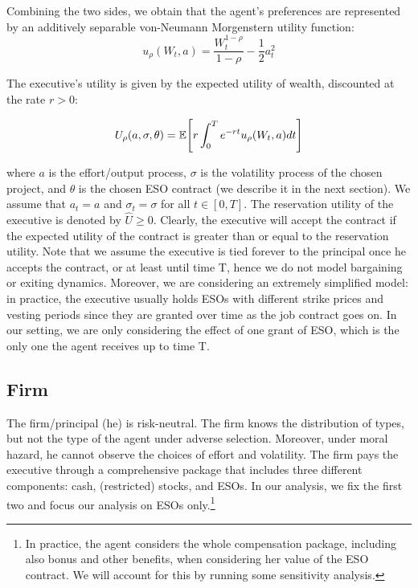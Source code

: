 Combining the two sides, we obtain that the agent's preferences are represented by an additively separable von-Neumann Morgenstern utility function:
$$ u_\rho (W_t, a) = \frac{W_t^{1-\rho}}{1-\rho} - \frac{1}{2}a_t^2 $$

The executive's utility is given by the expected utility of wealth, discounted at the rate $r>0$:

$$ U_\rho (a, \sigma, \theta) = \operatorname{\mathbb{E}} \Biggl[r \int_{0}^{T} e^{-rt} u_\rho (W_t, a) dt \Biggr]$$

where $a$ is the effort/output process, $\sigma$ is the volatility process of the chosen project, and $\theta$ is the chosen ESO contract (we describe it in the next section). We assume that $a_t=a$ and $\sigma_t=\sigma$ for all $t \in [0, T]$. The reservation utility of the executive is denoted by $\hat{U} \ge 0$. Clearly, the executive will accept the contract if the expected utility of the contract is greater than or equal to the reservation utility.
Note that we assume the executive is tied forever to the principal once he accepts the contract, or at least until time T, hence we do not model bargaining or exiting dynamics. Moreover, we are considering an extremely simplified model: in practice, the executive usually holds ESOs with different strike prices and vesting periods since they are granted over time as the job contract goes on. In our setting, we are only considering the effect of one grant of ESO, which is the only one the agent receives up to time T. 

\subsection{Firm}
The firm/principal (he) is risk-neutral. The firm knows the distribution of types, but not the type of the agent under adverse selection. Moreover, under moral hazard, he cannot observe the choices of effort and volatility. 
The firm pays the executive through a comprehensive package that includes three different components: cash, (restricted) stocks, and ESOs. In our analysis, we fix the first two and focus our analysis on ESOs only.\footnote{In practice, the agent considers the whole compensation package, including also bonus and other benefits, when considering her value of the ESO contract. We will account for this by running some sensitivity analysis.} 


